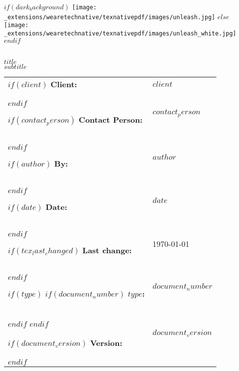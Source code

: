 \begin{titlepage}

\vspace*{-3cm}

\begin{center}
  $if(dark_background)$
    \texttt{[image: \_extensions/wearetechnative/texnativepdf/images/unleash.jpg]}
  $else$
    \texttt{[image: \_extensions/wearetechnative/texnativepdf/images/unleash\_white.jpg]}
  $endif$
\end{center}

\begin{spacing}{2.0}

\noindent
\\
{\huge {\MakeUppercase{$title$}}}\\
{\Large {$subtitle$}}\\
\end{spacing}


\setlength\extrarowheight{3pt}
\begin{flushleft}
\noindent\begin{tabular}{@{}l l }

$if(client)$
{\bf Client:} & $client$ \\
$endif$

$if(contact_person)$
  {\bf Contact Person:} & $contact_person$ \\
$endif$

$if(author)$
{\bf By: } & $author$ \\
$endif$

$if(date)$
{\bf Date: } & $date$ \\
$endif$

$if(tex_last_changed)$
{\bf Last change:} & \today \\
$endif$

$if(type)$
  $if(document_number)$
  {\bf $type$:} & $document_number$ \\
  $endif$
$endif$

$if(document_version)$
{\bf Version:} & $document_version$ \\
$endif$

\end{tabular}
\end{flushleft}

\end{titlepage}

